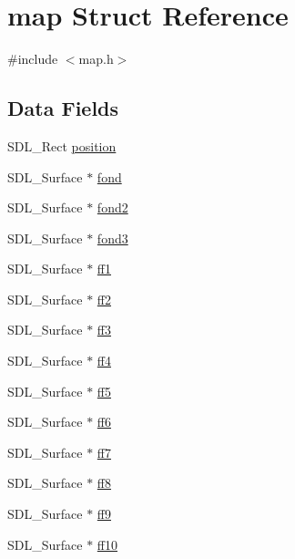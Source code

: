 \hypertarget{structmap}{}\section{map Struct Reference}
\label{structmap}


{\ttfamily \#include $<$map.\+h$>$}

\subsection*{Data Fields}
\begin{DoxyCompactItemize}
\item 
S\+D\+L\+\_\+\+Rect \hyperlink{structmap_a22eebe2fbf7d3d3fea525b97643fb9fc}{position}
\item 
S\+D\+L\+\_\+\+Surface $\ast$ \hyperlink{structmap_a38064e9b5686f65248082cb565bbce7b}{fond}
\item 
S\+D\+L\+\_\+\+Surface $\ast$ \hyperlink{structmap_a29e14b90ad5198d0052985f56a9f72de}{fond2}
\item 
S\+D\+L\+\_\+\+Surface $\ast$ \hyperlink{structmap_a9ed7f9e559bd649cd29c8961bb647b5a}{fond3}
\item 
S\+D\+L\+\_\+\+Surface $\ast$ \hyperlink{structmap_a59ad2fe0eba6d2c08155c88b8bf70616}{ff1}
\item 
S\+D\+L\+\_\+\+Surface $\ast$ \hyperlink{structmap_a58bbce138993d52fb34f9edbb2a503d0}{ff2}
\item 
S\+D\+L\+\_\+\+Surface $\ast$ \hyperlink{structmap_ad870601f4cd6b75d2f96aed3b420613f}{ff3}
\item 
S\+D\+L\+\_\+\+Surface $\ast$ \hyperlink{structmap_a316ffe59c864ed21dd9aa13b0898c3ec}{ff4}
\item 
S\+D\+L\+\_\+\+Surface $\ast$ \hyperlink{structmap_adf16263aee044b418c28efe29a20c4cb}{ff5}
\item 
S\+D\+L\+\_\+\+Surface $\ast$ \hyperlink{structmap_afb11a81c816e6d841a9fc9bf35a60838}{ff6}
\item 
S\+D\+L\+\_\+\+Surface $\ast$ \hyperlink{structmap_ae64470af38e36afe08e36b5871ca23c6}{ff7}
\item 
S\+D\+L\+\_\+\+Surface $\ast$ \hyperlink{structmap_a2e226623545eb3ae7160bd7456f62996}{ff8}
\item 
S\+D\+L\+\_\+\+Surface $\ast$ \hyperlink{structmap_a2d9f00e2fbaa2f766c36bb303784836d}{ff9}
\item 
S\+D\+L\+\_\+\+Surface $\ast$ \hyperlink{structmap_a78fcadf4e5c79c20df3863c4cf433a6b}{ff10}
\end{DoxyCompactItemize}


